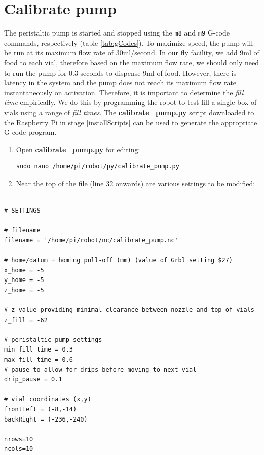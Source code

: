 \documentclass[]{book}
\theoremstyle{definition}
\theoremstyle{definition}
\theoremstyle{definition}
\theoremstyle{remark}
\begin{document}
\section{Calibrate pump}\label{calibratePump}

The peristaltic pump is started and stopped using the \texttt{m8} and
\texttt{m9} G-code commands, respectively (table \ref{tab:gCodes}). To
maximize speed, the pump will be run at its maximum flow rate of
30ml/second. In our fly facility, we add 9ml of food to each vial,
therefore based on the maximum flow rate, we should only need to run the
pump for 0.3 seconds to dispense 9ml of food. However, there is latency
in the system and the pump does not reach its maximum flow rate
instantaneously on activation. Therefore, it is important to determine
the \emph{fill time} empirically. We do this by programming the robot to
test fill a single box of vials using a range of \emph{fill times}. The
\textbf{calibrate\_pump.py} script downloaded to the Raspberry Pi in
stage \ref{installScripts} can be used to generate the appropriate
G-code program.

\begin{enumerate}
\def\labelenumi{\arabic{enumi}.}
\item
  Open \textbf{calibrate\_pump.py} for editing:

\begin{verbatim}
sudo nano /home/pi/robot/py/calibrate_pump.py
\end{verbatim}
\item
  Near the top of the file (line 32 onwards) are various settings to be
  modified:
\end{enumerate}

\begin{verbatim}

# SETTINGS

# filename
filename = '/home/pi/robot/nc/calibrate_pump.nc'

# home/datum + homing pull-off (mm) (value of Grbl setting $27)
x_home = -5
y_home = -5
z_home = -5

# z value providing minimal clearance between nozzle and top of vials
z_fill = -62 

# peristaltic pump settings
min_fill_time = 0.3
max_fill_time = 0.6
# pause to allow for drips before moving to next vial
drip_pause = 0.1 

# vial coordinates (x,y)
frontLeft = (-8,-14)
backRight = (-236,-240)

nrows=10
ncols=10
\end{verbatim}
\end{document}
